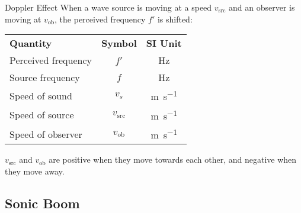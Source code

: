 \documentclass[12pt,compress,aspectratio=169]{beamer}
\begin{document}
\begin{frame}{Doppler Effect}
  When a wave source is moving at a speed $v_\text{src}$ and an observer is
  moving at $v_\text{ob}$, the perceived frequency $f'$ is shifted:

  \begin{center}
    \begin{tabular}{l|c|c}
      \rowcolor{pink}
      \textbf{Quantity} & \textbf{Symbol} & \textbf{SI Unit}\\
      Perceived frequency & $f'$  & \si\hertz \\
      Source frequency    & $f$   & \si\hertz \\
      Speed of sound      & $v_s$ & \si{\metre\per\second}\\
      Speed of source & $v_\text{src}$ & \si{\metre\per\second}\\
      Speed of observer & $v_\text{ob}$ & \si{\metre\per\second}
    \end{tabular}
  \end{center}
  $v_\text{src}$ and $v_\text{ob}$ are positive when they move towards each
  other, and negative when they move away.
\end{frame}



\subsection{Sonic Boom}
\end{document}
